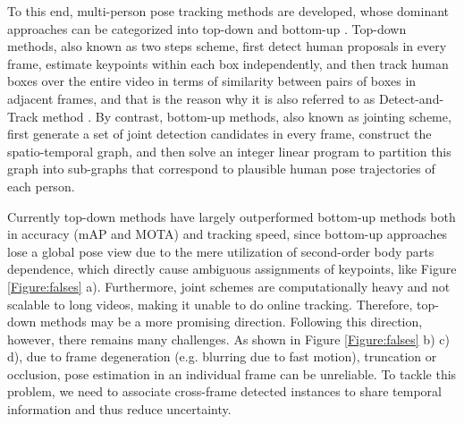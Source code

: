 \documentclass{bmvc2k}
\begin{document}
To this end, multi-person pose tracking methods are developed, whose dominant approaches can be categorized into top-down \cite{girdhar2017detect} and bottom-up \cite{insafutdinov2017arttrack,iqbal2017posetrack}. Top-down methods, also known as two steps scheme, first detect human proposals in every frame, estimate  keypoints within each box independently, and then track human boxes over the entire video in terms of similarity between pairs of boxes in adjacent frames, and that is the reason why it is also referred to as Detect-and-Track method \cite{girdhar2017detect}. By contrast, bottom-up methods, also known as jointing scheme, first generate a set of joint detection candidates in every frame, construct the spatio-temporal graph, and then solve an integer linear program to partition this graph into sub-graphs that correspond to plausible human pose trajectories of each person.

Currently top-down methods have largely outperformed bottom-up methods both in accuracy (mAP and MOTA) and tracking speed, since bottom-up approaches lose a global pose view due to the mere utilization of second-order body parts dependence, which directly cause ambiguous assignments of keypoints, like Figure \ref{Figure:falses} a). Furthermore, joint schemes are computationally heavy and not scalable to long videos, making it unable to do online tracking. Therefore, top-down methods may be a more promising direction. Following this direction, however, there remains many challenges. As shown in Figure \ref{Figure:falses} b) c) d), due to frame degeneration (e.g. blurring due to fast motion), truncation or occlusion, pose estimation in an individual frame can be unreliable. To tackle this problem, we need to associate cross-frame detected instances to share temporal information and thus reduce uncertainty. 
\end{document}
